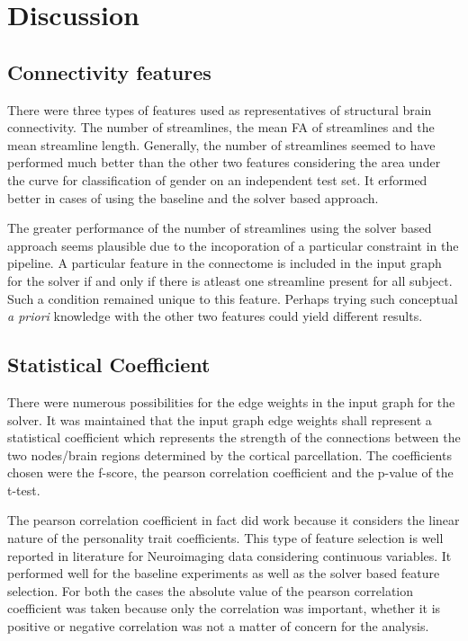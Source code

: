 \documentclass[msthesis.tex]{subfiles}
\begin{document}
\chapter{Discussion}


\section{Connectivity features}
There were three types of features used as representatives of structural brain connectivity. The number of streamlines, the mean FA of streamlines and the mean streamline length. Generally, the number of streamlines seemed to have performed much better than the other two features considering the area under the curve for classification of gender on an independent test set. It erformed better in cases of using the baseline and the solver based approach.

The greater performance of the number of streamlines using the solver based approach seems plausible due to the incoporation of a particular constraint in the pipeline. A particular feature in the connectome is included in the input graph for the solver if and only if there is atleast one streamline present for all subject. Such a condition remained unique to this feature. Perhaps trying such conceptual \textit{a priori} knowledge with the other two features could yield different results. 

\section{Statistical Coefficient}
There were numerous possibilities for the edge weights in the input graph for the solver. It was maintained that the input graph edge weights shall represent a statistical coefficient which represents the strength of the connections between the two nodes/brain regions determined by the cortical parcellation. The coefficients chosen were the f-score, the pearson correlation coefficient and the p-value of the t-test. 

The pearson correlation coefficient in fact did work because it considers the linear nature of the personality trait coefficients. This type of feature selection is well reported in literature for Neuroimaging data considering continuous variables. It performed well for the baseline experiments as well as the solver based feature selection. For both the cases the absolute value of the pearson correlation coefficient was taken because only the correlation was important, whether it is positive or negative correlation was not a matter of concern for the analysis.
\end{document}
